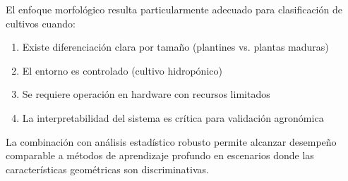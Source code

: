 El enfoque morfológico resulta particularmente adecuado para clasificación de cultivos cuando:
\begin{enumerate}
\item Existe diferenciación clara por tamaño (plantines vs. plantas maduras)
\item El entorno es controlado (cultivo hidropónico)
\item Se requiere operación en hardware con recursos limitados
\item La interpretabilidad del sistema es crítica para validación agronómica
\end{enumerate}

La combinación con análisis estadístico robusto permite alcanzar desempeño comparable a métodos de aprendizaje profundo en escenarios donde las características geométricas son discriminativas.